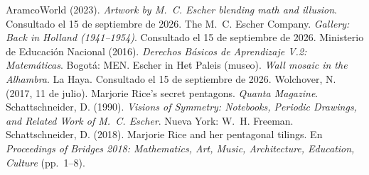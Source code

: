 \documentclass[11pt]{article}
\begin{document}
\begin{referencias}
 AramcoWorld (2023). \emph{Artwork by M.~C. Escher blending math and
  illusion}. Consultado el 15 de septiembre de 2026.
 The M.~C. Escher Company. \emph{Gallery: Back in Holland (1941--1954)}.
  Consultado el 15 de septiembre de 2026.
 Ministerio de Educación Nacional (2016). \emph{Derechos Básicos de
  Aprendizaje V.2: Matemáticas}. Bogotá: MEN.
 Escher in Het Paleis (museo). \emph{Wall mosaic in the Alhambra}. La Haya.
  Consultado el 15 de septiembre de 2026.
 Wolchover, N. (2017, 11 de julio). Marjorie Rice's secret pentagons.
  \emph{Quanta Magazine}.
 Schattschneider, D. (1990). \emph{Visions of Symmetry: Notebooks,
  Periodic Drawings, and Related Work of M.~C. Escher}. Nueva York: W.~H. Freeman.
 Schattschneider, D. (2018). Marjorie Rice and her pentagonal
  tilings. En \emph{Proceedings of Bridges 2018: Mathematics, Art, Music, Architecture,
  Education, Culture} (pp.~1--8).
\end{referencias}
\end{document}
